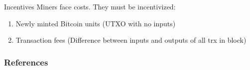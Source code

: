 \documentclass[handout]{beamer}
\begin{document}
\begin{frame}{Incentives}
Miners face costs. They must be incentivized:

\begin{enumerate}
	\item Newly minted Bitcoin units (UTXO with no inputs)
	\item Transaction fees (Difference between inputs and outputs of all trx in block)
\end{enumerate} \vspace{1em}

\end{frame}

\begin{frame}%
	\frametitle{References}
	
	
\end{frame}
\end{document}

